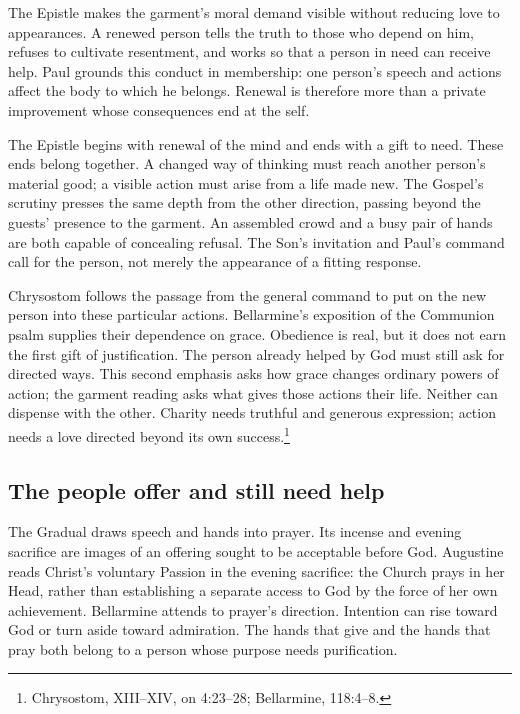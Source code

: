 The Epistle makes the garment's moral demand visible without reducing
love to appearances. A renewed person tells the truth to those who depend
on him, refuses to cultivate resentment, and works so that a person in
need can receive help. Paul grounds this conduct in membership: one
person's speech and actions affect the body to which he belongs. Renewal
is therefore more than a private improvement whose consequences end at
the self.

The Epistle begins with renewal of the mind and ends with a gift to
need. These ends belong together. A changed way of thinking must reach
another person's material good; a visible action must arise from a
life made new. The Gospel's scrutiny presses the same depth from the
other direction, passing beyond the guests' presence to the garment.
An assembled crowd and a busy pair of hands are both capable of
concealing refusal. The Son's invitation and Paul's command call
for the person, not merely the appearance of a fitting response.

Chrysostom follows the passage from the general command to put on the
new person into these particular actions. Bellarmine's exposition of
the Communion psalm supplies their dependence on grace. Obedience is
real, but it does not earn the first gift of justification. The person
already helped by God must still ask for directed ways. This second
emphasis asks how grace changes ordinary powers of action; the garment
reading asks what gives those actions their life. Neither can dispense
with the other. Charity needs truthful and generous expression; action
needs a love directed beyond its own success.\footnote{Chrysostom,
 XIII--XIV, on 4:23--28; Bellarmine,
 118:4--8.}

\newpage
\subsection{The people offer and still need help}

The Gradual draws speech and hands into prayer. Its incense and evening
sacrifice are images of an offering sought to be acceptable before God.
Augustine reads Christ's voluntary Passion in the evening sacrifice:
the Church prays in her Head, rather than establishing a separate access
to God by the force of her own achievement. Bellarmine attends to prayer's
direction. Intention can rise toward God or turn aside toward admiration.
The hands that give and the hands that pray both belong to a person whose
purpose needs purification.

